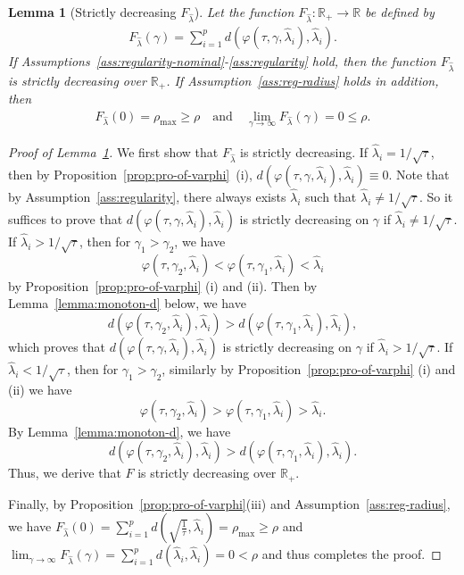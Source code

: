 \documentclass[11pt]{article}
\def\R{\mathbb{R}}
\newtheorem{lemma}{Lemma}
\newcommand{\bgeqn}{\begin{eqnarray}}
\newcommand{\edeqn}{\end{eqnarray}}
\def\R{\mathbb{R}}
\newcommand{\wh}{\widehat}
\begin{document}
\begin{lemma}[Strictly decreasing $F_{\wh\lambda}$]\label{lemma:property-of-F}
    Let the function $
    F_{\wh\lambda}:\R_+\to \R$ be defined by 
    \bgeqn 
    F_{\wh\lambda}(\gamma)=\sum_{i=1}^p d(\varphi(\tau, \gamma, \widehat{\lambda}_i), \widehat{\lambda}_i).
    \edeqn 
    If Assumptions~\ref{ass:regularity-nominal}-\ref{ass:regularity} hold, then the function $F_{\wh\lambda}$ is strictly decreasing over $\R_+$. If Assumption~\ref{ass:reg-radius} holds in addition, then 
    \bgeqn 
    F_{\wh\lambda}(0) =  \rho_{\max} \geq  \rho \quad  \text{and}\quad  \lim_{\gamma\to\infty} F_{\wh\lambda}(\gamma) = 0 \leq  \rho.
    \edeqn 
\end{lemma}
\begin{proof}[Proof of Lemma~\ref{lemma:property-of-F}]
    We first show that $F_{\wh\lambda}$ is strictly decreasing. If $\wh\lambda_i=1/\sqrt{\tau}$, then by Proposition~\ref{prop:pro-of-varphi}~(i), $d(\varphi(\tau, \gamma, {\wh\lambda}_i), \wh\lambda_i)\equiv 0$. Note that by Assumption~\ref{ass:regularity}, there always exists $\wh\lambda_i$ such that $\wh\lambda_i\neq 1/\sqrt{\tau}$. So it suffices to prove that $d(\varphi(\tau, \gamma, {\wh\lambda}_i), \wh\lambda_i)$ is strictly decreasing on $\gamma$ if $\wh\lambda_i\neq 1/\sqrt{\tau}$. If $\wh\lambda_i > 1/\sqrt{\tau}$, then for $\gamma_1 > \gamma_2$, we have 
    \[
        \varphi(\tau, \gamma_2, \wh{\lambda}_i) < \varphi(\tau, \gamma_1, \wh{\lambda}_i) < \wh\lambda_i
    \]
    by Proposition~\ref{prop:pro-of-varphi} (i) and (ii). Then by Lemma~\ref{lemma:monoton-d} below, we have 
    \[
        d(\varphi(\tau, \gamma_2, \wh{\lambda}_i), \wh\lambda_i) > d(\varphi(\tau, \gamma_1, \wh{\lambda}_i), \wh\lambda_i),
    \]
    which proves that $d(\varphi(\tau, \gamma, \wh{\lambda}_i), \wh\lambda_i)$ is strictly decreasing on $\gamma$ if $\wh\lambda_i > 1/\sqrt{\tau}$. If $\wh\lambda_i < 1/\sqrt{\tau}$, then for $\gamma_1 > \gamma_2$, similarly by Proposition~\ref{prop:pro-of-varphi} (i) and (ii) we have 
    \[
        \varphi(\tau, \gamma_2, \wh{\lambda}_i) > \varphi(\tau, \gamma_1, \wh{\lambda}_i) > \wh\lambda_i.
    \]
    By Lemma~\ref{lemma:monoton-d}, we have 
    \[
        d(\varphi(\tau, \gamma_2, \wh{\lambda}_i), \wh\lambda_i) > d(\varphi(\tau, \gamma_1, \wh{\lambda}_i), \wh\lambda_i).
    \]
    Thus, we derive that $F$ is strictly decreasing over $\R_+$. 

    Finally, by Proposition~\ref{prop:pro-of-varphi}(iii) and Assumption~\ref{ass:reg-radius}, we have $F_{\wh\lambda}(0) = \sum_{i=1}^p d(\sqrt{\frac{1}{\tau}}, \wh\lambda_i) = \rho_{\max} \geq  \rho$ and $\lim_{\gamma\to\infty} F_{\wh\lambda}(\gamma) = \sum_{i=1}^p d(\wh\lambda_i,\wh\lambda_i) = 0 <  \rho$ and thus completes the proof.
\end{proof}
\end{document}
